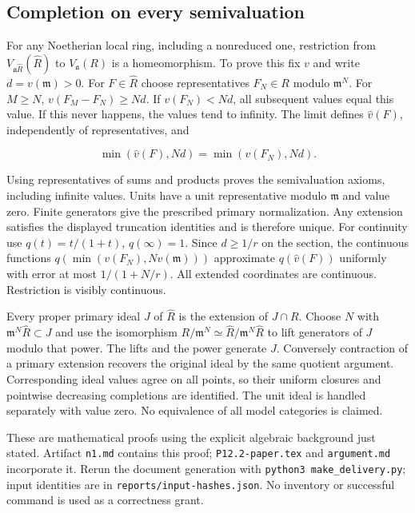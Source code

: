 \documentclass[11pt]{article}
\begin{document}
\subsection{Completion on every semivaluation}

For any Noetherian local ring, including a nonreduced one, restriction from $V_{\mathfrak a\widehat R}(\widehat R)$ to $V_{\mathfrak a}(R)$ is a homeomorphism. To prove this fix $v$ and write $d=v(\mathfrak m)>0$. For $F\in\widehat R$ choose representatives $F_N\in R$ modulo $\mathfrak m^N$. For $M\ge N$, $v(F_M-F_N)\ge Nd$. If $v(F_N)<Nd$, all subsequent values equal this value. If this never happens, the values tend to infinity. The limit defines $\widehat v(F)$, independently of representatives, and

\[
\min(\widehat v(F),Nd)=\min(v(F_N),Nd).
\]

Using representatives of sums and products proves the semivaluation axioms, including infinite values. Units have a unit representative modulo $\mathfrak m$ and value zero. Finite generators give the prescribed primary normalization. Any extension satisfies the displayed truncation identities and is therefore unique. For continuity use $q(t)=t/(1+t)$, $q(\infty)=1$. Since $d\ge1/r$ on the section, the continuous functions $q(\min(v(F_N),Nv(\mathfrak m)))$ approximate $q(\widehat v(F))$ uniformly with error at most $1/(1+N/r)$. All extended coordinates are continuous. Restriction is visibly continuous.

Every proper primary ideal $J$ of $\widehat R$ is the extension of $J\cap R$. Choose $N$ with $\mathfrak m^N\widehat R\subset J$ and use the isomorphism $R/\mathfrak m^N\simeq\widehat R/\mathfrak m^N\widehat R$ to lift generators of $J$ modulo that power. The lifts and the power generate $J$. Conversely contraction of a primary extension recovers the original ideal by the same quotient argument. Corresponding ideal values agree on all points, so their uniform closures and pointwise decreasing completions are identified. The unit ideal is handled separately with value zero. No equivalence of all model categories is claimed.

These are mathematical proofs using the explicit algebraic background just stated. Artifact \texttt{n1.\allowbreak{}md} contains this proof; \texttt{P12.\allowbreak{}2-\allowbreak{}paper.\allowbreak{}tex} and \texttt{argument.\allowbreak{}md} incorporate it. Rerun the document generation with \texttt{python3 make\_\allowbreak{}delivery.\allowbreak{}py}; input identities are in \texttt{reports/\allowbreak{}input-\allowbreak{}hashes.\allowbreak{}json}. No inventory or successful command is used as a correctness grant.
\end{document}
